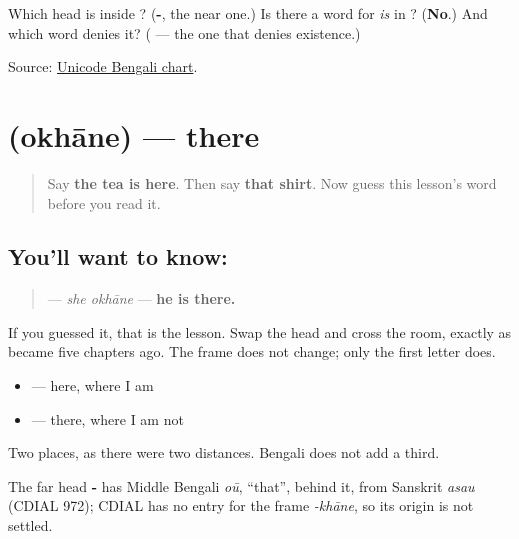\begin{tcolorbox}[breakable,colback=teal!4,colframe=teal!35!black,title={Before you move on}]
Which head is inside \textbf{}? (\textbf{-}, the near one.) Is there a word for \emph{is} in \textbf{ }? (\textbf{No}.) And which word denies it? (\textbf{} — the one that denies existence.)

Source: \href{https://www.unicode.org/charts/PDF/U0980.pdf}{Unicode Bengali chart}.
\end{tcolorbox}
\section[\texorpdfstring{\bn{ওখানে} (okhāne)}{ওখানে (okhāne)}]{ (okhāne) — there}

\label{lesson:BN-C26-okhane}



\begin{quote}
Say \textbf{the tea is here}. Then say \textbf{that shirt}. Now guess this lesson's word before you read it.
\end{quote}

\subsection*{You'll want to know: }
\begin{quote}
\textbf{ } — \emph{she okhāne} — \textbf{he is there.}
\end{quote}

If you guessed it, that is the lesson. Swap the head and cross the room, exactly as \textbf{} became \textbf{} five chapters ago. The frame does not change; only the first letter does.

\begin{itemize}
\raggedright
  \item \textbf{} — here, where I am
  \item \textbf{} — there, where I am not
\end{itemize}

Two places, as there were two distances. Bengali does not add a third.

\begin{cousinweb}
The far head \textbf{-} has Middle Bengali \emph{oū}, \textquotedblleft{}that\textquotedblright{}, behind it, from Sanskrit \emph{asau} (CDIAL 972); CDIAL has no entry for the frame \emph{-khāne}, so its origin is not settled.
\end{cousinweb}

